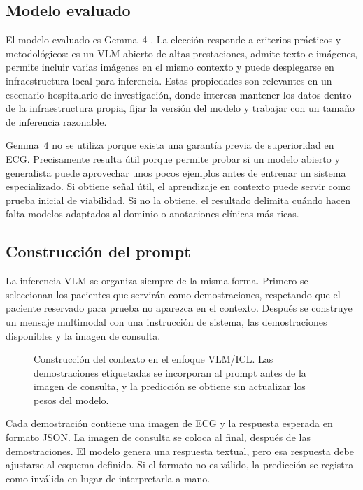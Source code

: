 \subsection{Modelo evaluado}

El modelo evaluado es Gemma~4 \cite{gemma4card}. La elección responde a criterios prácticos y metodológicos: es un VLM abierto de altas prestaciones, admite texto e imágenes, permite incluir varias imágenes en el mismo contexto y puede desplegarse en infraestructura local para inferencia. Estas propiedades son relevantes en un escenario hospitalario de investigación, donde interesa mantener los datos dentro de la infraestructura propia, fijar la versión del modelo y trabajar con un tamaño de inferencia razonable.

Gemma~4 no se utiliza porque exista una garantía previa de superioridad en ECG. Precisamente resulta útil porque permite probar si un modelo abierto y generalista puede aprovechar unos pocos ejemplos antes de entrenar un sistema especializado. Si obtiene señal útil, el aprendizaje en contexto puede servir como prueba inicial de viabilidad. Si no la obtiene, el resultado delimita cuándo hacen falta modelos adaptados al dominio o anotaciones clínicas más ricas.

\subsection{Construcción del prompt}

La inferencia VLM se organiza siempre de la misma forma. Primero se seleccionan los pacientes que servirán como demostraciones, respetando que el paciente reservado para prueba no aparezca en el contexto. Después se construye un mensaje multimodal con una instrucción de sistema, las demostraciones disponibles y la imagen de consulta.

\begin{figure}[H]
  \centering
  \caption{Construcción del contexto en el enfoque VLM/ICL. Las demostraciones etiquetadas se incorporan al prompt antes de la imagen de consulta, y la predicción se obtiene sin actualizar los pesos del modelo.}
  \label{fig:icl_context_window}
\end{figure}

Cada demostración contiene una imagen de ECG y la respuesta esperada en formato JSON. La imagen de consulta se coloca al final, después de las demostraciones. El modelo genera una respuesta textual, pero esa respuesta debe ajustarse al esquema definido. Si el formato no es válido, la predicción se registra como inválida en lugar de interpretarla a mano.

